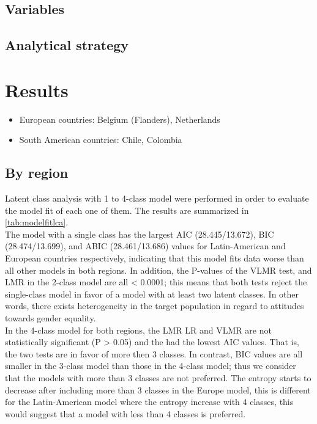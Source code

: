 \documentclass[12pt,twoside]{reedthesis}
\providecommand{\tightlist}{%
  \setlength{\itemsep}{0pt}\setlength{\parskip}{0pt}}
\begin{document}
\hypertarget{variables}{%
\section{Variables}\label{variables}}

\hypertarget{analytical-strategy}{%
\section{Analytical strategy}\label{analytical-strategy}}

\clearpage

\hypertarget{results}{%
\chapter{Results}\label{results}}
\begin{itemize}
\tightlist
\item
  European countries: Belgium (Flanders), Netherlands
\item
  South American countries: Chile, Colombia
\end{itemize}
\hypertarget{by-region}{%
\section{By region}\label{by-region}}

Latent class analysis with 1 to 4-class model were performed in order to evaluate the model fit of each one of them. The results are summarized in \ref{tab:modelfitlca}.\\
\newline 
The model with a single class has the largest AIC (28.445/13.672), BIC (28.474/13.699), and ABIC (28.461/13.686) values for Latin-American and European countries respectively, indicating that this model fits data worse than all other models in both regions. In addition, the P-values of the VLMR test, and LMR in the 2-class model are all \textless{} 0.0001; this means that both tests reject the single-class model in favor of a model with at least two latent classes. In other words, there exists heterogeneity in the target population in regard to attitudes towards gender equality.\\
\newline 
In the 4-class model for both regions, the LMR LR and VLMR are not statistically significant (P \textgreater{} 0.05) and the had the lowest AIC values. That is, the two tests are in favor of more then 3 classes.
\newline 
In contrast, BIC values are all smaller in the 3-class model than those in the 4-class model; thus we consider that the models with more than 3 classes are not preferred.
The entropy starts to decrease after including more than 3 classes in the Europe model, this is different for the Latin-American model where the entropy increase with 4 classes, this would suggest that a model with less than 4 classes is preferred.
\end{document}
